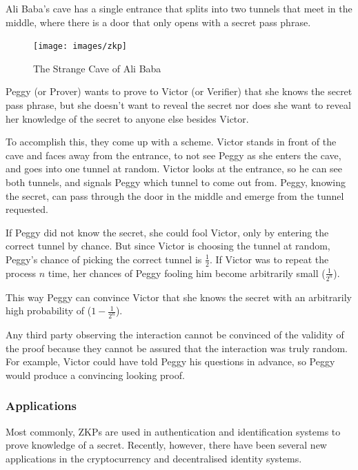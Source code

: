 Ali Baba's cave has a single entrance that splits into two tunnels that meet in the middle, where there is a door that only opens with a secret pass phrase.

\begin{figure}[h]
	\centering
	\texttt{[image: images/zkp]}
	\caption{The Strange Cave of Ali Baba}
	\label{fig:strange-cave-of-alibaba}
\end{figure}


\bigskip

Peggy (or Prover) wants to prove to Victor (or Verifier) that she knows the secret pass phrase, but she doesn't want to reveal the secret nor does she want to reveal her knowledge of the secret to anyone else besides Victor.

\bigskip

To accomplish this, they come up with a scheme.
Victor stands in front of the cave and faces away from the entrance, to not see Peggy as she enters the cave, and goes into one tunnel at random.
Victor looks at the entrance, so he can see both tunnels, and signals Peggy which tunnel to come out from.
Peggy, knowing the secret, can pass through the door in the middle and emerge from the tunnel requested.


\bigskip

If Peggy did not know the secret, she could fool Victor, only by entering the correct tunnel by chance.
But since Victor is choosing the tunnel at random, Peggy's chance of picking the correct tunnel is $\frac{1}{2}$. If Victor was to repeat the process $n$ time, her chances of Peggy fooling him become arbitrarily small ($\frac{1}{2^n}$).

This way Peggy can convince Victor that she knows the secret with an arbitrarily high probability of ($1 - \frac{1}{2^n}$).

\bigskip

Any third party observing the interaction cannot be convinced of the validity of the proof because they cannot be assured that the interaction was truly random. 
For example, Victor could have told Peggy his questions in advance, so Peggy would produce a convincing looking proof.


\subsubsection{Applications}
Most commonly, ZKPs are used in authentication and identification systems to prove knowledge of a secret. 
Recently, however, there have been several new applications in the cryptocurrency and decentralised identity systems.

